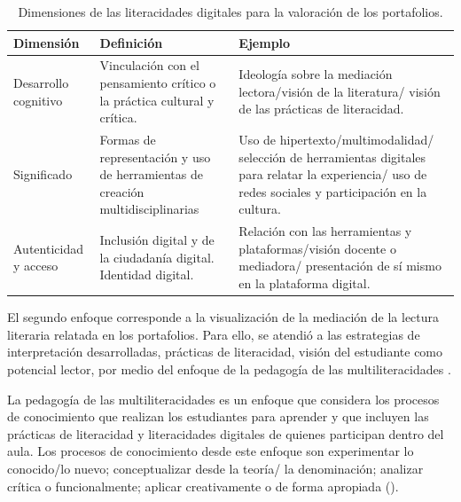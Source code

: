 \begin{table}[!htpb]
\centering
\begin{threeparttable}
\caption{Dimensiones de las literacidades digitales para la valoración de los portafolios.}
\label{tab-02}
\begin{tabular}{p{3cm} p{4cm} p{5cm} }
\toprule
Dimensión & Definición & Ejemplo \\
\midrule
Desarrollo cognitivo \cite{gillen_barton_2010} & Vinculación con el pensamiento crítico o la práctica cultural y crítica. & Ideología sobre la mediación lectora/visión de la literatura/ visión de las prácticas de literacidad. \\
Significado \cite{hafner_chik_jones_2015} & Formas de representación y uso de herramientas de creación multidisciplinarias & Uso de hipertexto/multimodalidad/ selección de herramientas digitales para relatar la experiencia/ uso de redes sociales y participación en la cultura. \\
Autenticidad y acceso \cite{gillen_barton_2010} & Inclusión digital y de la ciudadanía digital. Identidad digital. & Relación con las herramientas y plataformas/visión docente o mediadora/ presentación de sí mismo en la plataforma digital. \\
\bottomrule
\end{tabular}
\end{threeparttable}
\end{table}
	
El segundo enfoque corresponde a la visualización de la mediación de la
lectura literaria relatada en los portafolios. Para ello, se atendió a
las estrategias de interpretación desarrolladas, prácticas de
literacidad, visión del estudiante como potencial lector, por medio del
enfoque de la pedagogía de las multiliteracidades \cite{kalantzis2019,Kalantzis2023}.

La pedagogía de las multiliteracidades es un enfoque que considera los
procesos de conocimiento que realizan los estudiantes para aprender y
que incluyen las prácticas de literacidad y literacidades digitales de
quienes participan dentro del aula. Los procesos de conocimiento desde
este enfoque son experimentar lo conocido/lo nuevo; conceptualizar desde
la teoría/ la denominación; analizar crítica o funcionalmente; aplicar
creativamente o de forma apropiada ().

